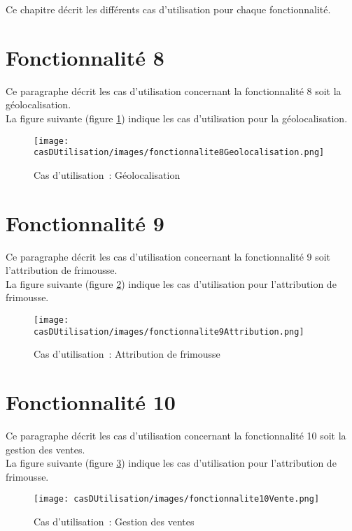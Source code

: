 Ce chapitre décrit les différents cas d'utilisation pour chaque fonctionnalité.


\section{Fonctionnalité 8}
Ce paragraphe décrit les cas d'utilisation concernant la fonctionnalité 8 soit la géolocalisation. \\

La figure suivante (figure \ref{diagrammeCasUtilisation8}) indique les cas d'utilisation pour la géolocalisation.
\begin{figure}[H]
	\centering
	\texttt{[image: casDUtilisation/images/fonctionnalite8Geolocalisation.png]}
	\caption{Cas d'utilisation~: Géolocalisation }
	\label{diagrammeCasUtilisation8}
\end{figure}

\section{Fonctionnalité 9}
Ce paragraphe décrit les cas d'utilisation concernant la fonctionnalité 9 soit l'attribution de frimousse. \\

La figure suivante (figure \ref{diagrammeCasUtilisation9}) indique les cas d'utilisation pour l'attribution de frimousse.
\begin{figure}[H]
	\centering
	\texttt{[image: casDUtilisation/images/fonctionnalite9Attribution.png]}
	\caption{Cas d'utilisation~: Attribution de frimousse }
	\label{diagrammeCasUtilisation9}
\end{figure}

\section{Fonctionnalité 10}
Ce paragraphe décrit les cas d'utilisation concernant la fonctionnalité 10 soit la gestion des ventes. \\

La figure suivante (figure \ref{diagrammeCasUtilisation10}) indique les cas d'utilisation pour l'attribution de frimousse.
\begin{figure}[H]
	\centering
	\texttt{[image: casDUtilisation/images/fonctionnalite10Vente.png]}
	\caption{Cas d'utilisation~: Gestion des ventes }
	\label{diagrammeCasUtilisation10}
\end{figure}
